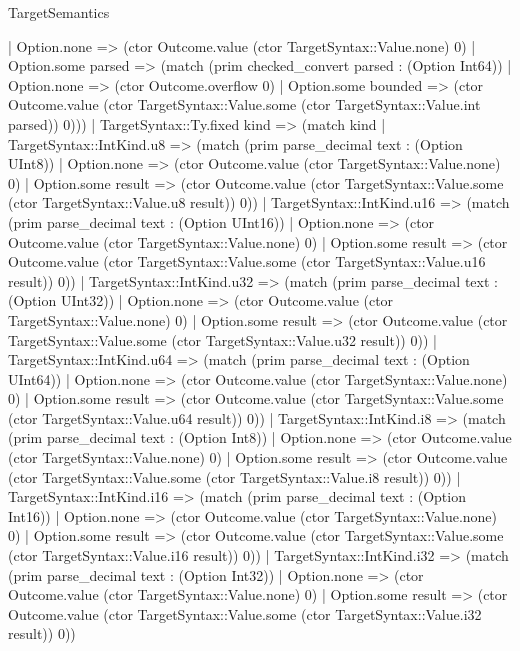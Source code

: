 \begin{lexlean}{TargetSemantics}
\begin{semanticmodule}
{              | Option.none => (ctor Outcome.value (ctor TargetSyntax::Value.none) 0)
              | Option.some parsed => (match (prim checked_convert parsed : (Option Int64))
                | Option.none => (ctor Outcome.overflow 0)
                | Option.some bounded => (ctor Outcome.value (ctor TargetSyntax::Value.some (ctor TargetSyntax::Value.int parsed)) 0)))
            | TargetSyntax::Ty.fixed kind => (match kind
              | TargetSyntax::IntKind.u8 => (match (prim parse_decimal text : (Option UInt8))
                | Option.none => (ctor Outcome.value (ctor TargetSyntax::Value.none) 0)
                | Option.some result => (ctor Outcome.value (ctor TargetSyntax::Value.some (ctor TargetSyntax::Value.u8 result)) 0))
              | TargetSyntax::IntKind.u16 => (match (prim parse_decimal text : (Option UInt16))
                | Option.none => (ctor Outcome.value (ctor TargetSyntax::Value.none) 0)
                | Option.some result => (ctor Outcome.value (ctor TargetSyntax::Value.some (ctor TargetSyntax::Value.u16 result)) 0))
              | TargetSyntax::IntKind.u32 => (match (prim parse_decimal text : (Option UInt32))
                | Option.none => (ctor Outcome.value (ctor TargetSyntax::Value.none) 0)
                | Option.some result => (ctor Outcome.value (ctor TargetSyntax::Value.some (ctor TargetSyntax::Value.u32 result)) 0))
              | TargetSyntax::IntKind.u64 => (match (prim parse_decimal text : (Option UInt64))
                | Option.none => (ctor Outcome.value (ctor TargetSyntax::Value.none) 0)
                | Option.some result => (ctor Outcome.value (ctor TargetSyntax::Value.some (ctor TargetSyntax::Value.u64 result)) 0))
              | TargetSyntax::IntKind.i8 => (match (prim parse_decimal text : (Option Int8))
                | Option.none => (ctor Outcome.value (ctor TargetSyntax::Value.none) 0)
                | Option.some result => (ctor Outcome.value (ctor TargetSyntax::Value.some (ctor TargetSyntax::Value.i8 result)) 0))
              | TargetSyntax::IntKind.i16 => (match (prim parse_decimal text : (Option Int16))
                | Option.none => (ctor Outcome.value (ctor TargetSyntax::Value.none) 0)
                | Option.some result => (ctor Outcome.value (ctor TargetSyntax::Value.some (ctor TargetSyntax::Value.i16 result)) 0))
              | TargetSyntax::IntKind.i32 => (match (prim parse_decimal text : (Option Int32))
                | Option.none => (ctor Outcome.value (ctor TargetSyntax::Value.none) 0)
                | Option.some result => (ctor Outcome.value (ctor TargetSyntax::Value.some (ctor TargetSyntax::Value.i32 result)) 0))
}
\end{semanticmodule}
\end{lexlean}
